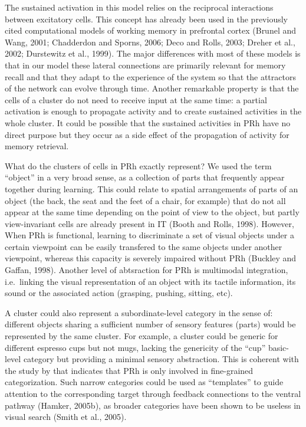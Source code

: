 \documentclass[
  11pt,
  a4paper,
]{scrbook}
\begin{document}
The sustained activation in this model relies on the reciprocal
interactions between excitatory cells. This concept has already been
used in the previously cited computational models of working memory in
prefrontal cortex (Brunel and Wang, 2001; Chadderdon and Sporns, 2006;
Deco and Rolls, 2003; Dreher et al., 2002; Durstewitz et al., 1999). The
major differences with most of these models is that in our model these
lateral connections are primarily relevant for memory recall and that
they adapt to the experience of the system so that the attractors of the
network can evolve through time. Another remarkable property is that the
cells of a cluster do not need to receive input at the same time: a
partial activation is enough to propagate activity and to create
sustained activities in the whole cluster. It could be possible that the
sustained activities in PRh have no direct purpose but they occur as a
side effect of the propagation of activity for memory retrieval.

What do the clusters of cells in PRh exactly represent? We used the term
``object'' in a very broad sense, as a collection of parts that
frequently appear together during learning. This could relate to spatial
arrangements of parts of an object (the back, the seat and the feet of a
chair, for example) that do not all appear at the same time depending on
the point of view to the object, but partly view-invariant cells are
already present in IT (Booth and Rolls, 1998). However, When PRh is
functional, learning to discriminate a set of visual objects under a
certain viewpoint can be easily transfered to the same objects under
another viewpoint, whereas this capacity is severely impaired without
PRh (Buckley and Gaffan, 1998). Another level of abtsraction for PRh is
multimodal integration, i.e.~linking the visual representation of an
object with its tactile information, its sound or the associated action
(grasping, pushing, sitting, etc).

A cluster could also represent a subordinate-level category in the sense
of: different objects sharing a sufficient number of sensory features
(parts) would be represented by the same cluster. For example, a cluster
could be generic for different espresso cups but not mugs, lacking the
genericity of the ``cup'' basic-level category but providing a minimal
sensory abstraction. This is coherent with the study by that indicates
that PRh is only involved in fine-grained categorization. Such narrow
categories could be used as ``templates'' to guide attention to the
corresponding target through feedback connections to the ventral pathway
(Hamker, 2005b), as broader categories have been shown to be useless in
visual search (Smith et al., 2005).
\end{document}
